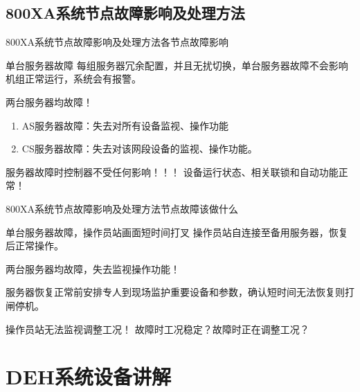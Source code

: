 \documentclass[12pt,hyperref={CJKbookmarks=true}]{beamer} %
\begin{document}
\subsection{800XA系统节点故障影响及处理方法}
\begin{frame}{800XA系统节点故障影响及处理方法}{各节点故障影响}
\begin{block}{\heiti 单台服务器故障}
			每组服务器冗余配置，并且无扰切换，单台服务器故障不会影响机组正常运行，系统会有报警。
		\end{block}
\pause
\begin{exampleblock}{\heiti 两台服务器均故障！}
			\begin{enumerate}
				\item  AS服务器故障：失去对所有设备监视、操作功能
				
				\item   CS服务器故障：失去对该网段设备的监视、操作功能。
				
			\end{enumerate}
		\end{exampleblock}
\pause
\begin{alertblock}{\heiti 服务器故障时控制器不受任何影响！！！}
			设备运行状态、相关联锁和自动功能正常！
		\end{alertblock}
\end{frame}
\begin{frame}{800XA系统节点故障影响及处理方法}{节点故障该做什么}
\begin{block}{\heiti 单台服务器故障，操作员站画面短时间打叉}
			操作员站自连接至备用服务器，恢复后正常操作。
		\end{block}
\pause
\begin{exampleblock}{\heiti 两台服务器均故障，失去监视操作功能！}
			
				服务器恢复正常前安排专人到现场监护重要设备和参数，确认短时间无法恢复则打闸停机。
			
		\end{exampleblock}
\pause
\begin{alertblock}{\heiti 操作员站无法监视调整工况！}
			故障时工况稳定？故障时正在调整工况？
		\end{alertblock}
\end{frame}
\section{DEH系统设备讲解}
\end{document}

